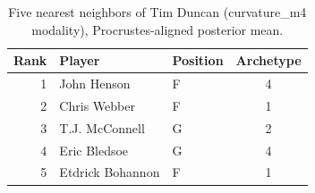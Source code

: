 \begin{table}[htbp]
  \centering\small
  \begin{tabular}{rllc}
    \toprule
    Rank & Player & Position & Archetype \\
    \midrule
    1 & John Henson & F & 4 \\
    2 & Chris Webber & F & 1 \\
    3 & T.J. McConnell & G & 2 \\
    4 & Eric Bledsoe & G & 4 \\
    5 & Etdrick Bohannon & F & 1 \\
    \bottomrule
  \end{tabular}
  \caption{Five nearest neighbors of Tim Duncan (curvature_m4 modality), Procrustes-aligned posterior mean.}
  \label{tab:Tim_Duncan_neighbors_curvature_m4}
\end{table}

